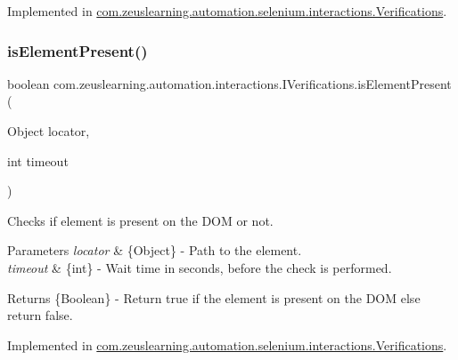 Implemented in \hyperlink{classcom_1_1zeuslearning_1_1automation_1_1selenium_1_1interactions_1_1Verifications_a0624db14fc06201e55890b160331bde9}{com.\+zeuslearning.\+automation.\+selenium.\+interactions.\+Verifications}.

\hypertarget{interfacecom_1_1zeuslearning_1_1automation_1_1interactions_1_1IVerifications_aacc6eef44a30e8e8e228229c31949a9c}{}\label{interfacecom_1_1zeuslearning_1_1automation_1_1interactions_1_1IVerifications_aacc6eef44a30e8e8e228229c31949a9c} 
\subsubsection{\texorpdfstring{is\+Element\+Present()}{isElementPresent()}\hspace{0.1cm}{\footnotesize\ttfamily [2/2]}}
{\footnotesize\ttfamily boolean com.\+zeuslearning.\+automation.\+interactions.\+I\+Verifications.\+is\+Element\+Present (\begin{DoxyParamCaption}\item[{Object}]{locator,  }\item[{int}]{timeout }\end{DoxyParamCaption})}

Checks if element is present on the D\+OM or not.


\begin{DoxyParams}{Parameters}
{\em locator} & \{Object\} -\/ Path to the element. \\
\hline
{\em timeout} & \{int\} -\/ Wait time in seconds, before the check is performed. \\
\hline
\end{DoxyParams}
\begin{DoxyReturn}{Returns}
\{Boolean\} -\/ Return {\ttfamily true} if the element is present on the D\+OM else return false. 
\end{DoxyReturn}


Implemented in \hyperlink{classcom_1_1zeuslearning_1_1automation_1_1selenium_1_1interactions_1_1Verifications_ace7cafb4b24bcba420f997a1bcc9ac6c}{com.\+zeuslearning.\+automation.\+selenium.\+interactions.\+Verifications}.

